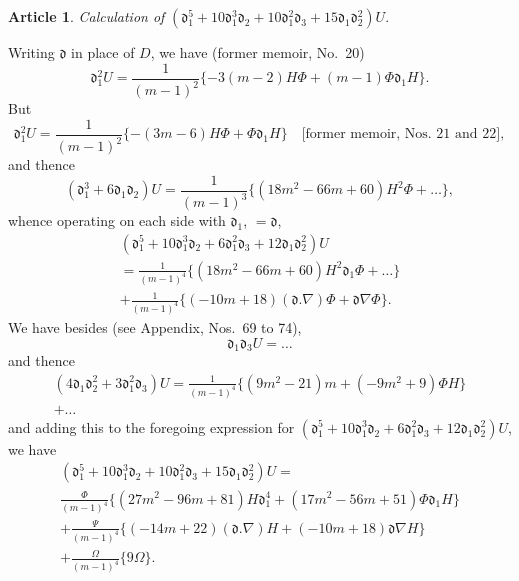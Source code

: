 \documentclass[12pt,a4paper]{article}
\theoremstyle{definition}
\newtheorem{art}{Article}[section]
\begin{document}
\begin{art}
\textit{Calculation of} $(\mathfrak{d}_1^5 + 10\mathfrak{d}_1^3\mathfrak{d}_2 + 10\mathfrak{d}_1^2\mathfrak{d}_3 + 15\mathfrak{d}_1\mathfrak{d}_2^2)U$.

Writing $\mathfrak{d}$ in place of $D$, we have (former memoir, No.~20)
\[
\mathfrak{d}_1^2 U = \frac{1}{(m - 1)^2}\{-3(m - 2)H\Phi + (m - 1)\Phi\mathfrak{d}_1 H\}.
\]
But
\[
\mathfrak{d}_1^2 U = \frac{1}{(m - 1)^2}\{-(3m - 6)H\Phi + \Phi\mathfrak{d}_1 H\} \quad \text{[former memoir, Nos.\ 21 and 22]},
\]
and thence
\[
(\mathfrak{d}_1^3 + 6\mathfrak{d}_1\mathfrak{d}_2)U = \frac{1}{(m - 1)^3}\{(18m^2 - 66m + 60)H^2\Phi + \ldots\},
\]
whence operating on each side with $\mathfrak{d}_1$, $= \mathfrak{d}$,
\begin{multline*}
(\mathfrak{d}_1^5 + 10\mathfrak{d}_1^3\mathfrak{d}_2 + 6\mathfrak{d}_1^2\mathfrak{d}_3 + 12\mathfrak{d}_1\mathfrak{d}_2^2)U \\
= \frac{1}{(m - 1)^4}\{(18m^2 - 66m + 60)H^2\mathfrak{d}_1\Phi + \ldots\} \\
+ \frac{1}{(m - 1)^4}\{(-10m + 18)(\mathfrak{d}.\nabla)\Phi + \mathfrak{d}\nabla\Phi\}.
\end{multline*}
We have besides (see Appendix, Nos.\ 69 to 74),
\[
\mathfrak{d}_1\mathfrak{d}_3 U = \ldots
\]
and thence
\begin{multline*}
(4\mathfrak{d}_1\mathfrak{d}_2^2 + 3\mathfrak{d}_1^2\mathfrak{d}_3)U = \frac{1}{(m - 1)^4}\{(9m^2 - 21)m + (-9m^2 + 9)\Phi H\} \\
+ \ldots
\end{multline*}
and adding this to the foregoing expression for $(\mathfrak{d}_1^5 + 10\mathfrak{d}_1^3\mathfrak{d}_2 + 6\mathfrak{d}_1^2\mathfrak{d}_3 + 12\mathfrak{d}_1\mathfrak{d}_2^2)U$, we have
\begin{multline*}
(\mathfrak{d}_1^5 + 10\mathfrak{d}_1^3\mathfrak{d}_2 + 10\mathfrak{d}_1^2\mathfrak{d}_3 + 15\mathfrak{d}_1\mathfrak{d}_2^2)U = \\
\frac{\Phi}{(m - 1)^4}\{(27m^2 - 96m + 81)H\mathfrak{d}_1^4 + (17m^2 - 56m + 51)\Phi\mathfrak{d}_1 H\} \\
+ \frac{\Psi}{(m - 1)^4}\{(-14m + 22)(\mathfrak{d}.\nabla)H + (-10m + 18)\mathfrak{d}\nabla H\} \\
+ \frac{\Omega}{(m - 1)^4}\{9\Omega\}.
\end{multline*}
\end{art}
\end{document}
